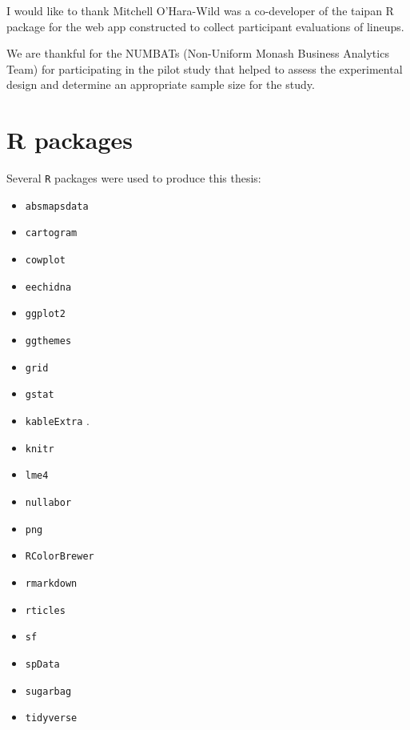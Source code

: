 \documentclass{monashthesis}
\begin{document}
I would like to thank Mitchell O'Hara-Wild was a co-developer of the taipan \autocite{taipan} R package for the web app constructed to collect participant evaluations of lineups.

We are thankful for the NUMBATs (Non-Uniform Monash Business Analytics Team) for participating in the pilot study that helped to assess the experimental design and determine an appropriate sample size for the study.

\hypertarget{r-packages}{%
\section{R packages}\label{r-packages}}

Several \texttt{R} \autocite{R} packages were used to produce this thesis:

\begin{itemize}
\tightlist
\item
  \texttt{absmapsdata} \autocite{ABSmaps}
\item
  \texttt{cartogram} \autocite{cartogram}
\item
  \texttt{cowplot} \autocite{cowplot}
\item
  \texttt{eechidna} \autocite{eechidna}
\item
  \texttt{ggplot2} \autocite{ggplot2}
\item
  \texttt{ggthemes} \autocite{ggthemes}
\item
  \texttt{grid} \autocite{grid}
\item
  \texttt{gstat} \autocite{gstat}
\item
  \texttt{kableExtra} \autocite{kableExtra}.
\item
  \texttt{knitr} \autocite{knitr}
\item
  \texttt{lme4} \autocite{lme4}
\item
  \texttt{nullabor} \autocite{nullabor}
\item
  \texttt{png} \autocite{png}
\item
  \texttt{RColorBrewer} \autocite{RColorBrewer}
\item
  \texttt{rmarkdown} \autocite{rmarkdown}
\item
  \texttt{rticles} \autocite{rticles}
\item
  \texttt{sf} \autocite{sf}
\item
  \texttt{spData} \autocite{spData}
\item
  \texttt{sugarbag} \autocite{sugarbag}
\item
  \texttt{tidyverse} \autocite{tidyverse}
\end{itemize}
\end{document}
